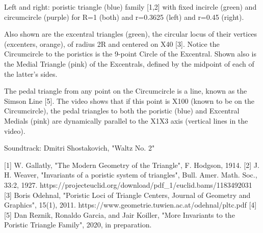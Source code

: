 Left and right: poristic triangle (blue) family [1,2] with fixed incircle (green) and circumcircle (purple) for R=1 (both) and r=0.3625 (left) and r=0.45 (right).  

Also shown are the excentral triangles (green), the circular locus of their vertices (excenters, orange), of radius 2R and centered on X40 [3]. Notice the Circumcircle to the poristics is the 9-point Circle of the Excentral. Shown also is the Medial Triangle (pink) of the Excentrals, defined by the midpoint of each of the latter's sides. 

The pedal triangle from any point on the Circumcircle is a line, known as the Simson Line [5]. The video shows that if this point is X100 (known to be on the Circumcircle), the pedal triangles to both the poristic (blue) and Excentral Medials (pink) are dynamically parallel to the X1X3 axis (vertical lines in the video).

Soundtrack: Dmitri Shostakovich, "Waltz No. 2"

[1] W. Gallatly, "The Modern Geometry of the Triangle", F. Hodgson, 1914.
[2] J. H. Weaver, "Invariants of a poristic system of triangles", Bull. Amer. Math. Soc., 33:2, 1927. https://projecteuclid.org/download/pdf_1/euclid.bams/1183492031
[3] Boris Odehnal, "Poristic Loci of Triangle Centers, Journal of Geometry and Graphics", 15(1), 2011. https://www.geometrie.tuwien.ac.at/odehnal/pltc.pdf
[4] 
[5] Dan Reznik, Ronaldo Garcia, and Jair Koiller, "More Invariants to the Poristic Triangle Family", 2020, in preparation.